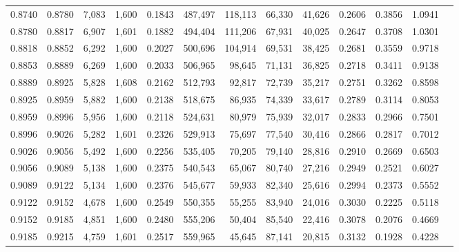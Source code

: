 \begin{tabular}{rrrrrrrrrrrrr}
0.8740 & 0.8780 &  7,083 & 1,600 &                                     0.1843 & 487,497 & 118,113 &  66,330 &  41,626 & 0.2606 & 0.3856 & 1.0941 \\
0.8780 & 0.8817 &  6,907 & 1,601 &                                     0.1882 & 494,404 & 111,206 &  67,931 &  40,025 & 0.2647 & 0.3708 & 1.0301 \\
0.8818 & 0.8852 &  6,292 & 1,600 &                                     0.2027 & 500,696 & 104,914 &  69,531 &  38,425 & 0.2681 & 0.3559 & 0.9718 \\
0.8853 & 0.8889 &  6,269 & 1,600 &                                     0.2033 & 506,965 &  98,645 &  71,131 &  36,825 & 0.2718 & 0.3411 & 0.9138 \\
0.8889 & 0.8925 &  5,828 & 1,608 &                                     0.2162 & 512,793 &  92,817 &  72,739 &  35,217 & 0.2751 & 0.3262 & 0.8598 \\
0.8925 & 0.8959 &  5,882 & 1,600 &                                     0.2138 & 518,675 &  86,935 &  74,339 &  33,617 & 0.2789 & 0.3114 & 0.8053 \\
0.8959 & 0.8996 &  5,956 & 1,600 &                                     0.2118 & 524,631 &  80,979 &  75,939 &  32,017 & 0.2833 & 0.2966 & 0.7501 \\
0.8996 & 0.9026 &  5,282 & 1,601 &                                     0.2326 & 529,913 &  75,697 &  77,540 &  30,416 & 0.2866 & 0.2817 & 0.7012 \\
0.9026 & 0.9056 &  5,492 & 1,600 &                                     0.2256 & 535,405 &  70,205 &  79,140 &  28,816 & 0.2910 & 0.2669 & 0.6503 \\
0.9056 & 0.9089 &  5,138 & 1,600 &                                     0.2375 & 540,543 &  65,067 &  80,740 &  27,216 & 0.2949 & 0.2521 & 0.6027 \\
0.9089 & 0.9122 &  5,134 & 1,600 &                                     0.2376 & 545,677 &  59,933 &  82,340 &  25,616 & 0.2994 & 0.2373 & 0.5552 \\
0.9122 & 0.9152 &  4,678 & 1,600 &                                     0.2549 & 550,355 &  55,255 &  83,940 &  24,016 & 0.3030 & 0.2225 & 0.5118 \\
0.9152 & 0.9185 &  4,851 & 1,600 &                                     0.2480 & 555,206 &  50,404 &  85,540 &  22,416 & 0.3078 & 0.2076 & 0.4669 \\
0.9185 & 0.9215 &  4,759 & 1,601 &                                     0.2517 & 559,965 &  45,645 &  87,141 &  20,815 & 0.3132 & 0.1928 & 0.4228 \\

\end{tabular}
